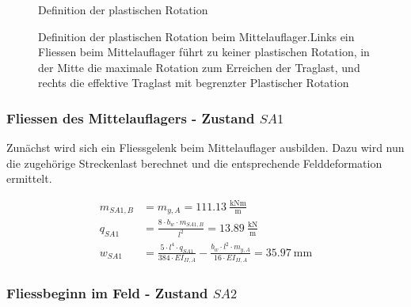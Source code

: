 \documentclass[
  11pt,
  letterpaper,
]{scrreprt}
\begin{document}
\begin{figure}[H]


\caption{\label{fig-jag_mechanismus}Definition der plastischen Rotation}

\end{figure}%

\begin{figure}[H]


\caption{\label{fig-jag_plast_rot_A}Definition der plastischen Rotation
beim Mittelauflager.Links ein Fliessen beim Mittelauflager führt zu
keiner plastischen Rotation, in der Mitte die maximale Rotation zum
Erreichen der Traglast, und rechts die effektive Traglast mit begrenzter
Plastischer Rotation}

\end{figure}%

\subsubsection{\texorpdfstring{Fliessen des Mittelauflagers - Zustand
\(SA1\)}{Fliessen des Mittelauflagers - Zustand SA1}}\label{fliessen-des-mittelauflagers---zustand-sa1}

Zunächst wird sich ein Fliessgelenk beim Mittelauflager ausbilden. Dazu
wird nun die zugehörige Streckenlast berechnet und die entsprechende
Felddeformation ermittelt.

\[
\begin{aligned}
m_{SA1 , B}& = m_{y , A} = 111.13 \ \frac{\mathrm{kNm}}{\mathrm{m}} \\ 
q_{SA1}& = \frac{8 \cdot b_{w} \cdot m_{SA1 , B}}{l^{2}} = 13.89 \ \frac{\mathrm{kN}}{\mathrm{m}} \\ 
w_{SA1}& = \frac{5 \cdot l^{4} \cdot q_{SA1}}{384 \cdot EI_{II , A}} - \frac{b_{w} \cdot l^{2} \cdot m_{y , A}}{16 \cdot EI_{II , A}} = 35.97 \ \mathrm{mm} \end{aligned}
\]

\subsubsection{\texorpdfstring{Fliessbeginn im Feld - Zustand
\(SA2\)}{Fliessbeginn im Feld - Zustand SA2}}\label{fliessbeginn-im-feld---zustand-sa2}
\end{document}
